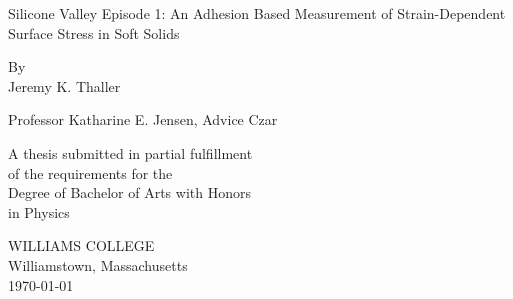 \documentclass[12pt, oneside]{book}
\begin{document}
\begin{titlepage}
\begin{center}

\vspace*{2cm}

{\huge Silicone Valley Episode 1: An Adhesion Based Measurement of Strain-Dependent Surface Stress in Soft Solids} %

\vspace{2cm}

{\large By\\\vspace{.5em}Jeremy K. Thaller}

\vspace{2cm}
{Professor Katharine E. Jensen, Advice Czar}


\vfill

A thesis submitted in partial fulfillment\\
of the requirements for the\\
Degree of Bachelor of Arts with Honors\\
in Physics

\vspace*{3cm}

WILLIAMS COLLEGE\\
Williamstown, Massachusetts\\
\today %
\end{center}
\end{titlepage}

\frontmatter 
\end{document}
